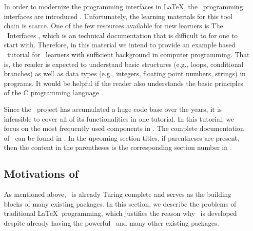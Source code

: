 \documentclass{ltugboat}
\begin{document}
In order to modernize the programming interfaces in \LaTeX, the \liii~programming interfaces are introduced \cite{mittelbach2020quo}.
Unfortunately, the learning materials for this tool chain is scarce.
One of the few resources available for new learners is The \liii\ Interfaces \cite{l3interface}, which is an technical documentation that is difficult to for one to start with.
Therefore, in this material we intend to provide an example based \liii~tutorial for \liii~learners with sufficient background in computer programming.
That is, the reader is expected to understand basic structures (e.g., loops, conditional branches) as well as data types (e.g., integers, floating point numbers, strings) in programs. 
It would be helpful if the reader also understands the basic principles of the C programming language \cite{ritchie1988c}.



Since the \liii~project has accumulated a huge code base over the years, it is infeasible to cover all of its functionalities in one tutorial.
In this tutorial, we focus on the most frequently used components in \liii. 
The complete documentation of \liii\  can be found in \cite{l3interface}. 
In the upcoming section titles, if parentheses are present, then the content in the parentheses is the corresponding section number in \cite{l3interface}.

\subsection{Motivations of \liii}

As mentioned above, \LaTeXe~is already Turing complete and serves as the building blocks of many existing packages. In this section, we describe the problems of traditional \LaTeX~programming, which justifies the reason why \liii~is developed despite already having the powerful \LaTeXe~and many other existing packages.
\end{document}
